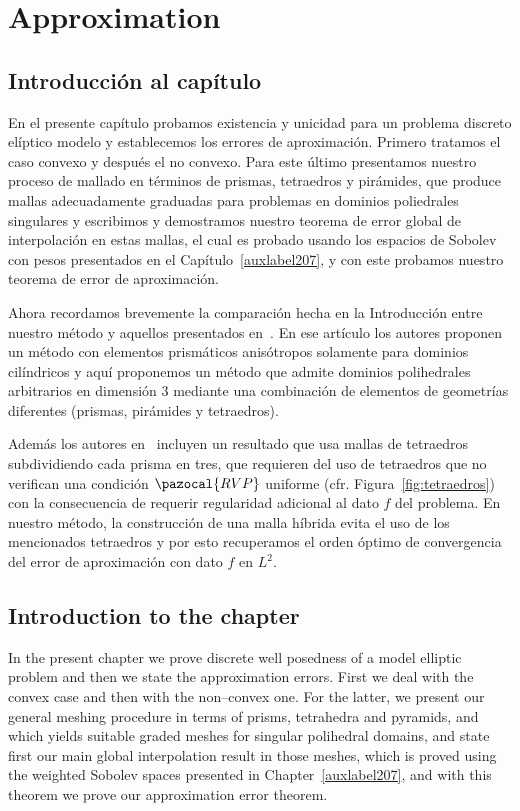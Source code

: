 \chapter{Approximation}\label{auxLabel100}
\section*{Introducci\'on al cap\'itulo}
En el presente cap\'itulo probamos existencia y unicidad
para un problema discreto el\'iptico modelo y establecemos
los errores de aproximaci\'on.
Primero tratamos el caso convexo y despu\'es el no convexo. 
Para este \'ultimo presentamos nuestro proceso de mallado
en t\'erminos de prismas, tetraedros y pir\'amides, que produce
mallas adecuadamente graduadas para problemas en dominios poliedrales singulares
y escribimos y demostramos nuestro teorema de error global de
interpolaci\'on en estas mallas, el cual es probado usando los espacios
de Sobolev con pesos presentados en el Cap\'itulo~\ref{auxlabel207},
y con este probamos nuestro teorema de error de aproximaci\'on.

Ahora recordamos brevemente la comparaci\'on hecha en
la Introducci\'on entre nuestro m\'etodo y 
aquellos presentados en~\cite{MR1866274}. En ese art\'iculo
los autores proponen un m\'etodo con elementos 
prism\'aticos anis\'otropos solamente para
dominios cil\'indricos y aqu\'i proponemos un m\'etodo
que admite dominios polihedrales arbitrarios en
dimensi\'on 3 mediante una combinaci\'on
de elementos de geometr\'ias diferentes (prismas,
pir\'amides y tetraedros).

Adem\'as los autores en~\cite{MR1866274} incluyen
un resultado que usa mallas de tetraedros subdividiendo
cada prisma en tres, que requieren del uso de
tetraedros que no verifican una condici\'on 
$\pazocal{RVP}$ uniforme (cfr. Figura~\ref{fig:tetraedros})
con la consecuencia de requerir regularidad
adicional al dato $f$ del problema. En nuestro m\'etodo,
la construcci\'on de una malla
h\'ibrida evita el uso de los mencionados tetraedros
y por esto recuperamos el orden \'optimo de convergencia
del error de aproximaci\'on con dato $f$ en $L^2$.

\section*{Introduction to the chapter}
In the present chapter we prove
discrete well posedness of a model elliptic problem
and then we state the approximation errors.
First we deal with the convex case and then with the  non--convex
one. For the latter, we present our general meshing procedure
in terms of prisms, tetrahedra and pyramids, and which yields
suitable graded meshes for singular polihedral domains, 
and state first our main
global interpolation result in those meshes, which is proved using the 
weighted Sobolev spaces presented in Chapter~\ref{auxlabel207},
and with this theorem we prove our approximation error theorem.

